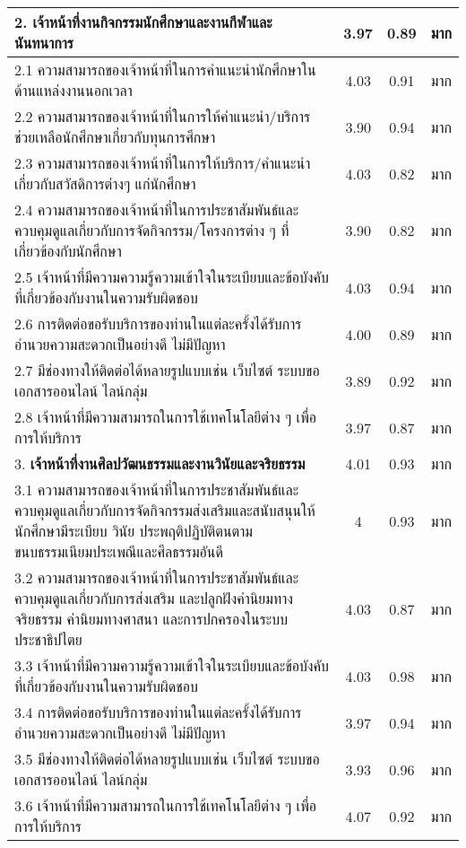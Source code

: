 \begin{longtable}{|>{\raggedright}p{9cm}|c|c|c|}
	2. \textbf{เจ้าหน้าที่งานกิจกรรมนักศึกษาและงานกีฬาและนันทนาการ} & 3.97  & 0.89 &  มาก \\ \hline
	2.1 ความสามารถของเจ้าหน้าที่ในการคำแนะนำนักศึกษาในด้านแหล่งงานนอกเวลา & 4.03 & 0.91 & มาก \\ \hline
	2.2 ความสามารถของเจ้าหน้าที่ในการให้คำแนะนำ/บริการช่วยเหลือนักศึกษาเกี่ยวกับทุนการศึกษา & 3.90 & 0.94& มาก \\ \hline
	2.3 ความสามารถของเจ้าหน้าที่ในการให้บริการ/คำแนะนำเกี่ยวกับสวัสดิการต่างๆ แก่นักศึกษา &  4.03 & 0.82 & มาก \\ \hline
	2.4 ความสามารถของเจ้าหน้าที่ในการประชาสัมพันธ์และควบคุมดูแลเกี่ยวกับการจัดกิจกรรม/โครงการต่าง ๆ ที่เกี่ยวข้องกับนักศึกษา &  3.90 & 0.82 & มาก \\ \hline
	2.5 เจ้าหน้าที่มีความความรู้ความเข้าใจในระเบียบและข้อบังคับที่เกี่ยวข้องกับงานในความรับผิดชอบ & 4.03 & 0.94 & มาก \\ \hline
	2.6 การติดต่อขอรับบริการของท่านในแต่ละครั้งได้รับการอำนวยความสะดวกเป็นอย่างดี ไม่มีปัญหา & 4.00 & 0.89 & มาก \\ \hline
	2.7 มีช่องทางให้ติดต่อได้หลายรูปแบบเช่น เว็บไซต์ ระบบขอเอกสารออนไลน์ ไลน์กลุ่ม & 3.89 & 0.92 & มาก \\ \hline
	2.8 เจ้าหน้าที่มีความสามารถในการใช้เทคโนโลยีต่าง ๆ เพื่อการให้บริการ & 3.97 & 0.87 & มาก \\ \hline
	3. \textbf{เจ้าหน้าที่งานศิลปวัฒนธรรมและงานวินัยและจริยธรรม} & 4.01 & 0.93 & มาก \\ \hline
	3.1 ความสามารถของเจ้าหน้าที่ในการประชาสัมพันธ์และควบคุมดูแลเกี่ยวกับการจัดกิจกรรมส่งเสริมและสนับสนุนให้นักศึกษามีระเบียบ วินัย ประพฤติปฏิบัติตนตามขนบธรรมเนียมประเพณีและศีลธรรมอันดี & 4 & 0.93 & มาก \\ \hline
	3.2 ความสามารถของเจ้าหน้าที่ในการประชาสัมพันธ์และควบคุมดูแลเกี่ยวกับการส่งเสริม และปลูกฝังค่านิยมทางจริยธรรม ค่านิยมทางศาสนา และการปกครองในระบบประชาธิปไตย & 4.03 & 0.87 & มาก\\\hline
	3.3 เจ้าหน้าที่มีความความรู้ความเข้าใจในระเบียบและข้อบังคับที่เกี่ยวข้องกับงานในความรับผิดชอบ & 4.03 & 0.98 & มาก\\\hline
	3.4 การติดต่อขอรับบริการของท่านในแต่ละครั้งได้รับการอำนวยความสะดวกเป็นอย่างดี ไม่มีปัญหา & 3.97 & 0.94 & มาก\\\hline
	3.5 มีช่องทางให้ติดต่อได้หลายรูปแบบเช่น เว็บไซต์ ระบบขอเอกสารออนไลน์ ไลน์กลุ่ม & 3.93 & 0.96 & มาก\\\hline
	3.6 เจ้าหน้าที่มีความสามารถในการใช้เทคโนโลยีต่าง ๆ เพื่อการให้บริการ & 4.07 & 0.92 & มาก\\\hline

\end{longtable}
